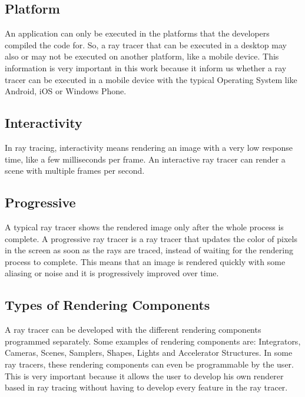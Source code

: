 \subsection{Platform}

\par
An application can only be executed in the platforms that the developers compiled the code for.
So, a ray tracer that can be executed in a desktop may also or may not be executed on another platform, like a mobile device.
This information is very important in this work because it inform us whether a ray tracer can be executed in a mobile device with the typical Operating System like Android, iOS or Windows Phone.

\subsection{Interactivity}

\par
In ray tracing, interactivity means rendering an image with a very low response time, like a few milliseconds per frame.
An interactive ray tracer can render a scene with multiple frames per second.

\subsection{Progressive}

\par
A typical ray tracer shows the rendered image only after the whole process is complete.
A progressive ray tracer is a ray tracer that updates the color of pixels in the screen as soon as the rays are traced, instead of waiting for the rendering process to complete.
This means that an image is rendered quickly with some aliasing or noise and it is progressively improved over time.

\subsection{Types of Rendering Components}

\par
A ray tracer can be developed with the different rendering components programmed separately.
Some examples of rendering components are: Integrators, Cameras, Scenes, Samplers, Shapes, Lights and Accelerator Structures.
In some ray tracers, these rendering components can even be programmable by the user.
This is very important because it allows the user to develop his own renderer based in ray tracing without having to develop every feature in the ray tracer.

